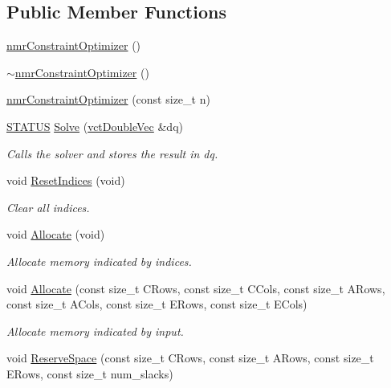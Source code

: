 \subsection*{Public Member Functions}
\begin{DoxyCompactItemize}
\item 
\hyperlink{classnmr_constraint_optimizer_af5dc94f25c1494f00b0b6fe5b011fa02}{nmr\+Constraint\+Optimizer} ()
\item 
\hyperlink{classnmr_constraint_optimizer_a2079234b022af96b6fac7034e7c1bec4}{$\sim$nmr\+Constraint\+Optimizer} ()
\item 
\hyperlink{classnmr_constraint_optimizer_a3417e04498146f162b976ea90fe22df3}{nmr\+Constraint\+Optimizer} (const size\+\_\+t n)
\item 
\hyperlink{classnmr_constraint_optimizer_ad46bf972892431d2c0a43a7099aec898}{S\+T\+A\+T\+U\+S} \hyperlink{classnmr_constraint_optimizer_ac049aa73698d8f5a785453ef3f254c16}{Solve} (\hyperlink{vct_dynamic_vector_types_8h_ade4b3068c86fb88f41af2e5187e491c2}{vct\+Double\+Vec} \&dq)
\begin{DoxyCompactList}\small\item\em Calls the solver and stores the result in dq. \end{DoxyCompactList}\item 
void \hyperlink{classnmr_constraint_optimizer_a5f4186e11727a61726d8164bcb778296}{Reset\+Indices} (void)
\begin{DoxyCompactList}\small\item\em Clear all indices. \end{DoxyCompactList}\item 
void \hyperlink{classnmr_constraint_optimizer_a4f8f9ad056b766e057d9acb8a92aea62}{Allocate} (void)
\begin{DoxyCompactList}\small\item\em Allocate memory indicated by indices. \end{DoxyCompactList}\item 
void \hyperlink{classnmr_constraint_optimizer_a6d76d6d3f15dec7f7ce692b4d53e9b2e}{Allocate} (const size\+\_\+t C\+Rows, const size\+\_\+t C\+Cols, const size\+\_\+t A\+Rows, const size\+\_\+t A\+Cols, const size\+\_\+t E\+Rows, const size\+\_\+t E\+Cols)
\begin{DoxyCompactList}\small\item\em Allocate memory indicated by input. \end{DoxyCompactList}\item 
void \hyperlink{classnmr_constraint_optimizer_a4cfcedd85cb25a577d0793c0f5ff9b2d}{Reserve\+Space} (const size\+\_\+t C\+Rows, const size\+\_\+t A\+Rows, const size\+\_\+t E\+Rows, const size\+\_\+t num\+\_\+slacks)

\end{DoxyCompactItemize}
